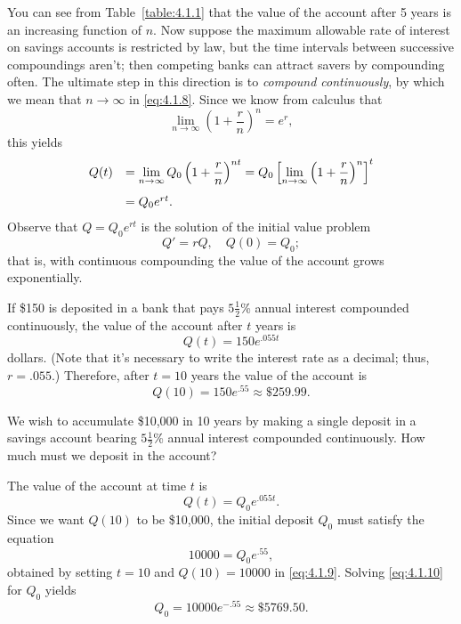 \medskip
You can see from Table~\ref{table:4.1.1} that the value of the account after 5 years is an
increasing function of $n$. Now suppose the maximum allowable rate of interest on savings accounts
is restricted by law, but the time intervals between successive compoundings aren't; then competing
banks can attract savers by compounding often. The ultimate step in this direction is to
{\color{blue}\it compound continuously}, by which we mean that $n\to\infty$ in \eqref{eq:4.1.8}.
Since we know from calculus that
\[
  \lim_{n\to\infty}\left(1+\frac{r}{n}\right)^{n}=e^{r},
\]
this yields
\[
  \begin{array}{rl}
    Q(t) & \displaystyle=\lim_{n\to\infty}Q_{0}\left(1+\frac{r}{n}\right)^{nt}=Q_{0}\left[ \lim_{n\to\infty}\left(1+\frac{r}{n}\right)^{n}\right]^{t} \\[12pt]
         & =Q_{0}e^{rt}.
  \end{array}
\]
Observe that $Q=Q_{0}e^{rt}$ is the solution of the initial value problem
\[
  Q'=rQ,\quad Q(0)=Q_{0};
\]
that is, with continuous compounding the value of the account grows exponentially.

\begin{example}
  \label{example:4.1.2} \rm If \$150 is deposited in a bank that pays $5{\frac{1}{2}}$\% annual
  interest compounded continuously, the value of the account after $t$ years is
  \[
    Q(t)=150e^{.055t}
  \]
  dollars. (Note that it's necessary to write the interest rate as a decimal; thus, $r=.055$.)
  Therefore, after $t=10$ years the value of the account is
  \[
    Q(10)=150e^{.55}\approx\$259.99.
  \]
\end{example}

\begin{example}
  \label{example:4.1.3} \rm We wish to accumulate \$10,000 in 10 years by making a single deposit in
  a savings account bearing $5{\frac{1}{2}}$\% annual interest compounded continuously. How much
  must we deposit in the account?
\end{example}

\begin{examplesolution}
\solution The value of the account at time $t$ is
\begin{equation}
  \label{eq:4.1.9}Q(t)=Q_{0}e^{.055t}.
\end{equation}
Since we want $Q(10)$ to be \$10,000, the initial deposit $Q_{0}$ must satisfy the equation
\begin{equation}
  \label{eq:4.1.10}10000=Q_{0}e^{.55},
\end{equation}
obtained by setting $t=10$ and $Q(10)=10000$ in \eqref{eq:4.1.9}. Solving \eqref{eq:4.1.10} for
$Q_{0}$ yields
\[
  Q_{0}=10000e^{-.55}\approx\$5769.50.
\]
\end{examplesolution}

